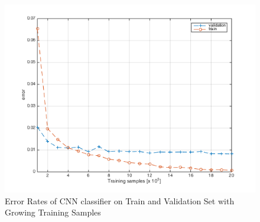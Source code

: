 \documentclass[12pt]{article}
\begin{document}
\begin{figure}[tbp]
	\centering
	\includegraphics[width =\textwidth]{errorcnn}		
	\caption{Error Rates of CNN classifier on Train and Validation Set with Growing Training Samples }
	\label{fig:cnnerror}
\end{figure}
\end{document}
